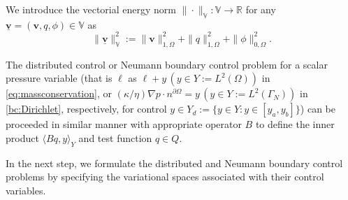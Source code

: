 \documentclass[smallextended]{svjour3}
\numberwithin{equation}{section}
\numberwithin{figure}{section}
\numberwithin{table}{section}
\newcommand\buv{\underline{\boldsymbol{v}}}
\newcommand\bv{\boldsymbol{v}}
\newcommand{\bbV}{\mathbb{V}}
\newcommand{\bbR}{\mathbb{R}}
\begin{document}
\noindent We introduce the vectorial energy norm $\| \cdot \|_{\bbV}: \bbV \to \bbR$ for any $\buv=(\bv, q, \phi) \in \bbV$ as
\begin{equation*}
    \|\buv\|_{\bbV}^2:= \| \bv\|_{1, \Omega}^2 + \| q\|_{1, \Omega}^2 + \|\phi \|_{0, \Omega}^2.
\end{equation*}

\begin{remark}
    The distributed control or Neumann boundary control problem for a scalar pressure variable (that is $\ell$ as $\ell + y\,  (y \in Y:=L^2(\Omega))$ in \eqref{eq:massconservation}, or $(\kappa/\eta) \nabla p \cdot n^{\partial \Omega} =y\, (y \in Y:=L^2(\Gamma_N))$ in \eqref{bc:Dirichlet}, respectively, for control $y \in Y_d:=\{y \in Y: y \in [y_a,y_b] \}$) can be proceeded in similar manner with appropriate operator $B$ to define the inner product $\langle B q, y\rangle_{Y}$ and test function $q \in Q$.
\end{remark}

In the next step, we formulate the distributed and Neumann boundary control problems by specifying the variational spaces associated with their control variables.

\end{document}
